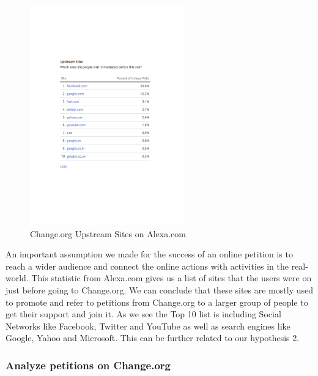 \begin{figure}[H]
\centering
\includegraphics[width=0.6\textwidth]{assets/ChangeUpstreamSites.pdf}
\caption{Change.org Upstream Sites on Alexa.com}
\label{fig:change.org_upstreamSites}
\end{figure}

An important assumption we made for the success of an online petition is to reach a wider audience and connect the online actions with activities in the real-world. This statistic from Alexa.com gives us a list of sites that the users were on just before going to Change.org. We can conclude that these sites are mostly used to promote and refer to petitions from Change.org to a larger group of people to get their support and join it. As we see the Top 10 list is including Social Networks like Facebook, Twitter and YouTube as well as search engines like Google, Yahoo and Microsoft. This can be further related to our hypothesis 2.  


\subsubsection{Analyze petitions on Change.org}

